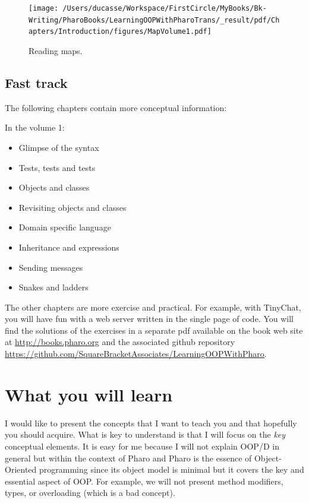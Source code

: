 \documentclass[10pt,twoside,english]{_support/latex/sbabook/sbabook}
\begin{document}
\begin{figure}

\begin{center}
\texttt{[image: /Users/ducasse/Workspace/FirstCircle/MyBooks/Bk-Writing/PharoBooks/LearningOOPWithPharoTrans/\_result/pdf/Chapters/Introduction/figures/MapVolume1.pdf]}\caption{Reading maps.\label{fgmap}}\end{center}
\end{figure}

\subsection{Fast track}
The following chapters contain more conceptual information:

In the volume 1:

\begin{itemize}
\item Glimpse of the syntax
\item Tests, tests and tests
\item Objects and classes
\item Revisiting objects and classes
\item Domain specific language
\item Inheritance and expressions
\item Sending messages
\item Snakes and ladders
\end{itemize}

The other chapters are more exercise and practical. For example, with TinyChat, you will have fun with a web server written in the single page of code. You will find the solutions of the exercises in a separate pdf available on the book web site at \url{http://books.pharo.org} and the associated github repository \url{https://github.com/SquareBracketAssociates/LearningOOPWithPharo}.
\section{What you will learn}
I would like to present the concepts that I want to teach you and that hopefully you should acquire. What is key to understand is that I will focus on the \textit{key} conceptual elements. It is easy for me because I will not explain OOP/D in general but within the context of Pharo and Pharo is the essence of Object-Oriented programming since its object model is minimal but it covers the key and essential aspect of OOP. For example, we will not present method modifiers, types, or overloading (which is a bad concept).
\end{document}
